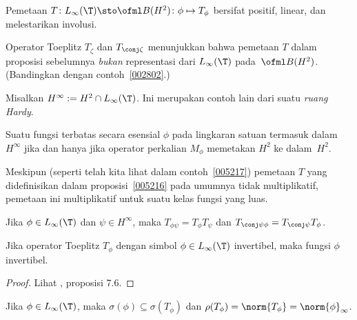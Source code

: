 \begin{prop}\label{005216} Pemetaan $T\colon L_\infty(\T) \sto \ofml B(H^2)\colon \phi
\mapsto T_\phi$ bersifat positif, linear, dan melestarikan involusi.
\end{prop}

\begin{exam}\label{005217} Operator Toeplitz $T_\zeta$ dan $T_{\conj\zeta}$ menunjukkan bahwa
pemetaan $T$ dalam proposisi sebelumnya \emph{bukan} representasi dari $L_\infty(\T)$
pada~$\ofml B(H^2)$. (Bandingkan dengan contoh~\ref{002802}.)
\end{exam}

\begin{notn} Misalkan $H^\infty := H^2 \cap L_\infty(\T)$.
Ini merupakan contoh lain dari suatu \emph{ruang Hardy}.
\end{notn}

\begin{prop} Suatu fungsi terbatas secara esensial $\phi$ pada lingkaran satuan termasuk dalam
$H^\infty$ jika dan hanya jika operator perkalian $M_\phi$ memetakan $H^2$ ke dalam~$H^2$.
\end{prop}

Meskipun (seperti telah kita lihat dalam contoh~\ref{005217}) pemetaan $T$ yang didefinisikan dalam
proposisi~\ref{005216} pada umumnya tidak multiplikatif, pemetaan ini multiplikatif untuk suatu
kelas fungsi yang luas.

\begin{prop} Jika $\phi \in L_\infty(\T)$ dan $\psi \in H^\infty$, maka $T_{\phi\psi} =
T_\phi T_\psi$ dan $T_{\conj\psi \phi} = T_{\conj\psi} T_\phi$.
\end{prop}

\begin{prop} Jika operator Toeplitz $T_\phi$ dengan simbol $\phi \in L_\infty(\T)$
invertibel, maka fungsi $\phi$ invertibel.
\end{prop}

\begin{proof} Lihat \cite{Douglas:1972}, proposisi 7.6. \ns \end{proof}

\begin{thm} Jika $\phi \in L_\infty(\T)$,
maka $\sigma(\phi) \subseteq \sigma(T_\phi)$ dan $\rho(T_\phi) = \norm{T_\phi} =
\norm{\phi}_\infty$.
\end{thm}


